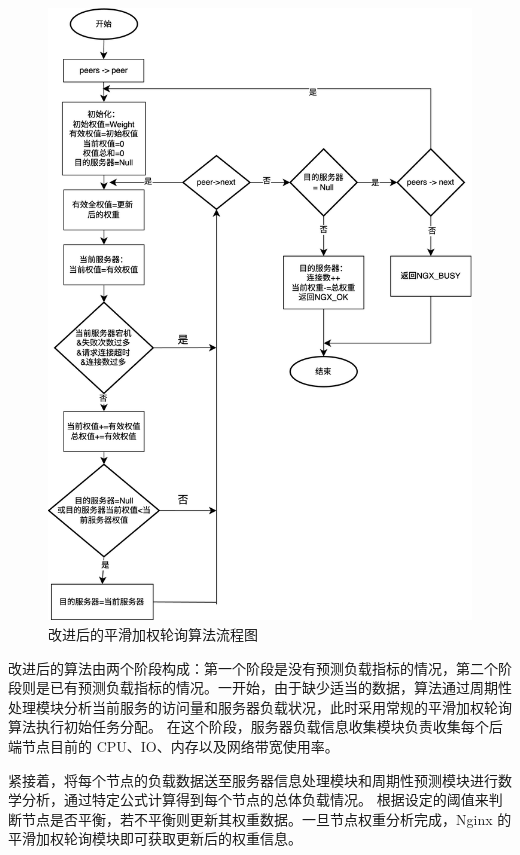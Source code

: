\begin{figure}[htbp]
  \centering
  \includegraphics[width=\textwidth]{figures/new_smoth_weight_balance.jpg}
  \caption{改进后的平滑加权轮询算法流程图}
  \label{new_smoth_weight_balance}
\end{figure}

改进后的算法由两个阶段构成：第一个阶段是没有预测负载指标的情况，第二个阶段则是已有预测负载指标的情况。一开始，由于缺少适当的数据，算法通过周期性处理模块分析当前服务的访问量和服务器负载状况，此时采用常规的平滑加权轮询算法执行初始任务分配。
在这个阶段，服务器负载信息收集模块负责收集每个后端节点目前的 CPU、IO、内存以及网络带宽使用率。

紧接着，将每个节点的负载数据送至服务器信息处理模块和周期性预测模块进行数学分析，通过特定公式计算得到每个节点的总体负载情况。
根据设定的阈值来判断节点是否平衡，若不平衡则更新其权重数据。一旦节点权重分析完成，Nginx 的平滑加权轮询模块即可获取更新后的权重信息。

